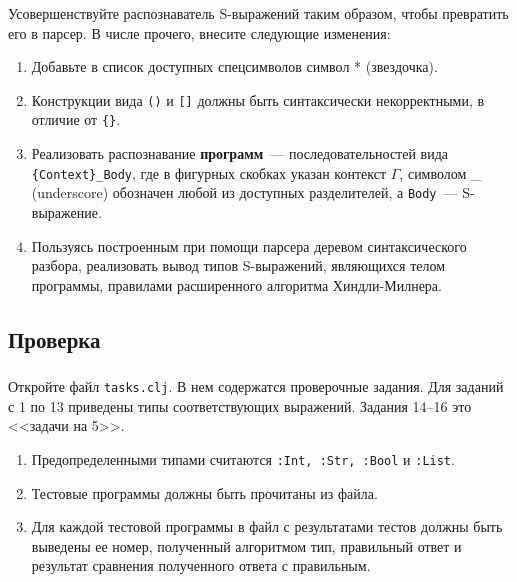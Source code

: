 \begin{frame}

	\frametitle{\insertsection}
	
	Усовершенствуйте распознаватель S-выражений таким образом, чтобы превратить его в парсер. В числе прочего, внесите следующие изменения:
	
	\begin{enumerate}
		\item Добавьте в список доступных спецсимволов символ * (звездочка).
		\item Конструкции вида \texttt{()} и \texttt{[]} должны быть синтаксически некорректными, в отличие от \texttt{\{\}}.
		\item Реализовать распознавание \textbf{программ}~--- последовательностей вида \texttt{\{Context\}\_Body}, где в фигурных скобках указан контекст \(\Gamma \), символом \_ (underscore) обозначен любой из доступных разделителей, а
		\texttt{Body}~--- S-выражение.
		\item Пользуясь построенным при помощи парсера деревом синтаксического разбора, реализовать вывод типов S-выражений, являющихся телом программы, правилами расширенного алгоритма Хиндли-Милнера.
	\end{enumerate}

\end{frame}


\subsection{Проверка}

\begin{frame}

	\frametitle{\insertsection}
	\framesubtitle{\insertsubsection}

	Откройте файл \texttt{tasks.clj}. В нем содержатся проверочные задания. Для заданий с 1 по 13 приведены типы соответствующих выражений.
	Задания 14--16 это <<задачи на 5>>.
	
	\begin{enumerate}
		\item Предопределенными типами считаются \texttt{:Int, :Str, :Bool} и \texttt{:List}.
		\item Тестовые программы должны быть прочитаны из файла.
		\item Для каждой тестовой программы в файл с результатами тестов должны быть выведены ее номер, полученный алгоритмом тип, правильный ответ и результат сравнения полученного ответа с правильным.
	\end{enumerate}

\end{frame}


